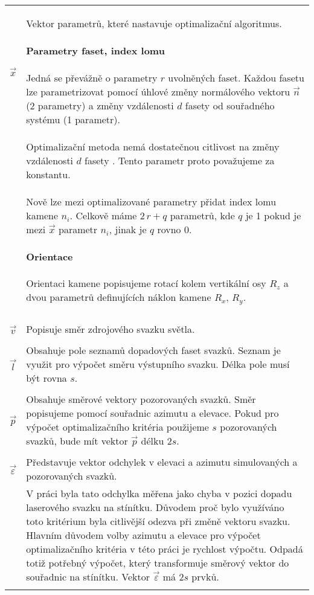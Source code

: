 \begin{tabular}{l p{12cm}}
$\vec{x}$ & Vektor parametrů, které nastavuje optimalizační algoritmus.
\paragraph{Parametry faset, index lomu}
\hspace{1mm}

 Jedná se převážně o parametry $r$ uvolněných faset. Každou fasetu lze parametrizovat pomocí úhlové změny normálového vektoru $\vec{n}$ (2 parametry) a změny vzdálenosti $d$ fasety od souřadného systému (1 parametr).\\
& Optimalizační metoda nemá dostatečnou citlivost na změny vzdálenosti $d$ fasety \cite{Bodlak2005}. Tento parametr proto považujeme za konstantu.\\
& Nově lze mezi optimalizované parametry přidat index lomu kamene $n_i$. Celkově máme $2\,r + q$ parametrů, kde $q$ je 1 pokud je mezi $\vec{x}$ parametr $n_i$, jinak je $q$ rovno 0.

\paragraph{Orientace} 
\hspace{1mm}

Orientaci kamene popisujeme rotací kolem vertikální osy $R_z$ a dvou parametrů definujících náklon kamene $R_x$, $R_y$. 
 \\ & \\
 
$\vec{v}$ & Popisuje směr zdrojového svazku světla.\\ & \\  

$\vec{l}$ & Obsahuje pole seznamů dopadových faset svazků. Seznam je využit pro výpočet směru výstupního svazku. Délka pole musí být rovna $s$. \\ & \\
 
$\vec{p}$ & Obsahuje směrové vektory pozorovaných svazků. Směr popisujeme pomocí souřadnic azimutu a elevace. Pokud pro výpočet optimalizačního kritéria použijeme $s$ pozorovaných svazků, bude mít vektor $\vec{p}$ délku $2s$. \\ & \\

$\vec{\varepsilon}$ & Představuje vektor odchylek v elevaci a azimutu simulovaných a pozorovaných svazků.\\ 
& V práci \cite{Bodlak2005} byla tato odchylka měřena jako chyba v pozici dopadu laserového svazku na stínítku. Důvodem proč bylo využíváno toto kritérium byla citlivější odezva při změně vektoru svazku. Hlavním důvodem volby azimutu a elevace pro výpočet optimalizačního kritéria v této práci je rychlost výpočtu. Odpadá totiž potřebný výpočet, který transformuje směrový vektor do souřadnic na stínítku. Vektor $\vec{\varepsilon}$ má $2s$ prvků.\\ & \\

\end{tabular}

